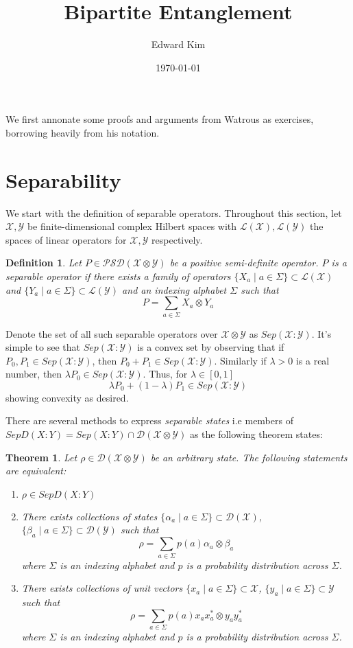 \documentclass[12pt]{article}
\newcommand{\X}{\mathcal{X}}
\newcommand{\Y}{\mathcal{Y}}
\newcommand{\LX}{\mathcal{L}(\mathcal{X})}
\newcommand{\LY}{\mathcal{L}(\mathcal{Y})}
\newcommand{\DX}{\mathcal{D}(\mathcal{X})}
\newcommand{\DY}{\mathcal{D}(\mathcal{Y})}
\newtheorem{definition}{Definition}
\newtheorem{theorem}{Theorem}
\begin{document}
\title{Bipartite Entanglement}
\author{Edward Kim}
\date{\today}
\maketitle

We first annonate some proofs and arguments from Watrous as exercises, borrowing heavily from his notation.

\section{Separability}
We start with the definition of separable operators. Throughout this section, let $\X,\Y$ be finite-dimensional complex Hilbert spaces with $\mathcal{L}(\mathcal{X}), \mathcal{L}(\mathcal{Y})$ the spaces of linear operators for $\mathcal{X},\mathcal{Y}$ respectively.
\begin{definition}
Let $P \in \mathcal{PSD}(\X \otimes \Y)$ be a positive semi-definite operator. $P$ is a \emph{separable operator} if there exists a family of operators $\{X_a \mid a \in \Sigma \} \subset \LX$ and $\{Y_a \mid a \in \Sigma \} \subset \LY$ and an indexing alphabet $\Sigma$ such that
\[
P = \sum_{a \in \Sigma} X_a \otimes Y_a
\]
\end{definition}
Denote the set of all such separable operators over $\X \otimes \Y$ as $Sep(\X:\Y)$.
It's simple to see that $Sep(\X:\Y)$ is a convex set by observing that if $P_0, P_1 \in Sep(\X : \Y)$, then $P_0 + P_1 \in Sep(\X: \Y)$. Similarly if $\lambda > 0$ is a real number, then $\lambda P_0 \in Sep(\X : \Y)$. Thus, for $\lambda \in [0,1]$
\[
\lambda P_0 + (1-\lambda)P_1 \in Sep(\X : \Y)
\]
showing convexity as desired.

There are several methods to express \emph{separable states} i.e members of $SepD(X : Y) = Sep(X:Y) \cap \mathcal{D}(\X \otimes \Y)$ as the following theorem states:
\begin{theorem}
  Let $\rho \in \mathcal{D}(\X \otimes \Y)$ be an arbitrary state. The following statements are equivalent:
  \begin{enumerate}
    \item $\rho \in SepD(X : Y)$
    \item There exists collections of states $\{\alpha_a \mid a \in \Sigma\} \subset \DX$, $\{\beta_a \mid a \in \Sigma\} \subset \DY$ such that
    \[
      \rho = \sum_{a \in \Sigma} p(a) \alpha_a \otimes \beta_a
    \]
    where $\Sigma$ is an indexing alphabet and $p$ is a probability distribution across $\Sigma$.
    \item There exists collections of unit vectors $\{x_a \mid a \in \Sigma\} \subset \X$, $\{y_a \mid a \in \Sigma\} \subset \Y$ such that
    \[
    \rho = \sum_{a \in \Sigma} p(a) x_ax_a^* \otimes y_ay_a^*
    \]
    where $\Sigma$ is an indexing alphabet and $p$ is a probability distribution across $\Sigma$.
  \end{enumerate}
\end{theorem}
\end{document}
